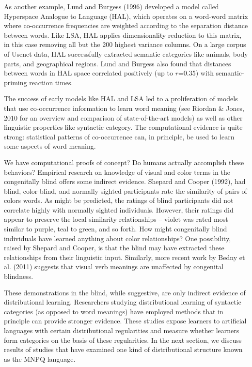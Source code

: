 \documentclass[man,floatsintext]{apa6}
\begin{document}
As another example, Lund and Burgess (1996) developed a model called Hyperspace Analogue to Language (HAL), which operates on a word-word matrix where co-occurrence frequencies are weighted according to the separation distance between words. Like LSA, HAL applies dimensionality reduction to this matrix, in this case removing all but the 200 highest variance columns. On a large corpus of Usenet data, HAL successfully extracted semantic categories like animals, body parts, and geographical regions. Lund and Burgess also found that distances between words in HAL space correlated positively (up to $r$=0.35) with semantic-priming reaction times.

The success of early models like HAL and LSA led to a proliferation of models that use co-occurrence information to learn word meaning (see Riordan \& Jones, 2010 for an overview and comparison of state-of-the-art models) as well as other linguistic properties like syntactic category. The computational evidence is quite strong: statistical patterns of co-occurrence can, in principle, be used to learn some aspects of word meaning.

We have computational proofs of concept? Do humans actually accomplish these behaviors? Empirical research on knowledge of visual and color terms in the congenitally blind offers some indirect evidence. Shepard and Cooper (1992), had blind, color-blind, and normally sighted participants rate the similarity of pairs of colors words. As might be predicted, the ratings of blind participants did not correlate highly with normally sighted individuals. However, their ratings did appear to preserve the local similarity relationships -- violet was rated most similar to purple, teal to green, and so forth. How might congenitally blind individuals have learned anything about color relationships? One possibility, raised by Shepard and Cooper, is that the blind may have extracted these relationships from their linguistic input. Similarly, more recent work by Bedny et al. (2011) suggests that visual verb meanings are unaffected by congenital blindness. %

These demonstrations in the blind, while suggestive, are only indirect evidence of distributional learning. Researchers studying distributional learning of syntactic categories (as opposed to word meanings) have employed methods that in principle can provide stronger evidence. These studies expose learners to artificial languages with certain distributional regularities and measure whether learners form categories on the basis of these regularities. In the next section, we discuss results of studies that have examined one kind of distributional structure known as the MNPQ language.
\end{document}

